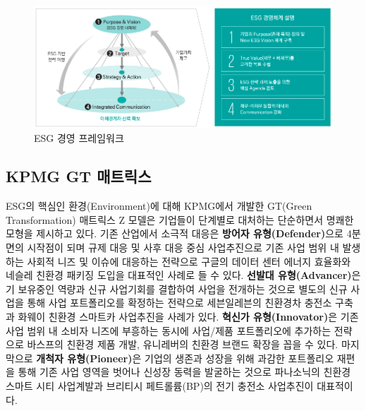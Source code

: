 \documentclass[smallextended]{svjour3}       %
\begin{document}
\begin{figure}

{\centering \includegraphics[width=1\linewidth]{fig/ESG-management-framework} 

}

\caption{ESG 경영 프레임워크}\label{fig:esg-management}
\end{figure}

\hypertarget{kpmg-gt-matrix}{%
\subsection{KPMG GT 매트릭스}\label{kpmg-gt-matrix}}

ESG의 핵심인 환경(Environment)에 대해 KPMG에서 개발한 GT(Green
Transformation) 매트릭스 Z 모델은 기업들이 단계별로 대처하는 단순하면서
명쾌한 모형을 제시하고 있다. 기존 산업에서 소극적 대응은 \textbf{방어자
유형(Defender)}으로 4분면의 시작점이 되며 규제 대응 및 사후 대응 중심
사업추진으로 기존 사업 범위 내 발생하는 사회적 니즈 및 이슈에 대응하는
전략으로 구글의 데이터 센터 에너지 효율화와 네슬레 친환경 패키징 도입을
대표적인 사례로 들 수 있다. \textbf{선발대 유형(Advancer)}은 기 보유중인
역량과 신규 사업기회를 결합하여 사업을 전개하는 것으로 별도의 신규
사업을 통해 사업 포트폴리오를 확정하는 전략으로 세븐일레븐의 친환경차
충전소 구축과 화웨이 친환경 스마트카 사업추진을 사례가 있다.
\textbf{혁신가 유형(Innovator)}은 기존 사업 범위 내 소비자 니즈에
부흥하는 동시에 사업/제품 포트폴리오에 추가하는 전략으로 바스프의 친환경
제품 개발, 유니레버의 친환경 브랜드 확장을 꼽을 수 있다. 마지막으로
\textbf{개척자 유형(Pioneer)}은 기업의 생존과 성장을 위해 과감한
포트폴리오 재편을 통해 기존 사업 영역을 벗어나 신성장 동력을 발굴하는
것으로 파나소닉의 친환경 스마트 시티 사업계발과 브리티시 페트롤륨(BP)의
전기 충전소 사업추진이 대표적이다.
\end{document}
